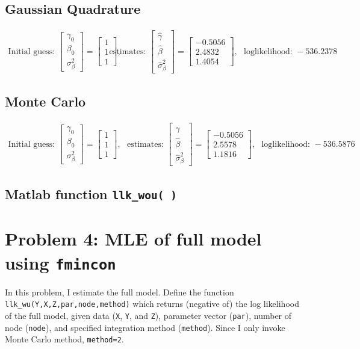 \documentclass[11pt,letter]{article}
\newcounter{lem}[section] \setcounter{lem}{0}
\newcommand{\bmat}[1]{\begin{bmatrix} #1 \end{bmatrix}}%
\newcommand{\code}[1]{\texttt{#1}}
\begin{document}
\subsection*{Gaussian Quadrature}
\begin{align*}
\text{Initial guess: }\bmat{\gamma_0 \\ \beta_0 \\ \sigma_\beta^2} = \bmat{1 \\ 1 \\ 1}, \ \ \ 
&\text{estimates: }\bmat{\hat{\gamma} \\ \hat{\beta} \\ \hat{\sigma}_\beta^2} = \bmat{-0.5056 \\ 2.4832 \\ 1.4054}, \ \ \ 
\text{loglikelihood: }-536.2378 
\end{align*}

\subsection*{Monte Carlo}
\begin{align*}
\text{Initial guess: }\bmat{\gamma_0 \\ \beta_0 \\ \sigma_\beta^2} = \bmat{1 \\ 1 \\ 1}, \ \ \ 
\text{estimates: }\bmat{\hat{\gamma} \\ \hat{\beta} \\ \hat{\sigma}_\beta^2} = \bmat{-0.5056 \\ 2.5578 \\ 1.1816}, \ \ \ 
\text{loglikelihood: }-536.5876
\end{align*}


\subsection*{Matlab function \code{llk\_wou( )}}



\section*{Problem 4: MLE of full model using \code{fmincon}}

In this problem, I estimate the full model. Define the function \code{llk\_wu(Y,X,Z,par,node,method)} which returns (negative of) the log likelihood of the full model, given data (\code{X}, \code{Y}, and \code{Z}), parameter vector (\code{par}), number of node (\code{node}), and specified integration method (\code{method}). Since I only invoke Monte Carlo method, \code{method=2}.  
\end{document}

